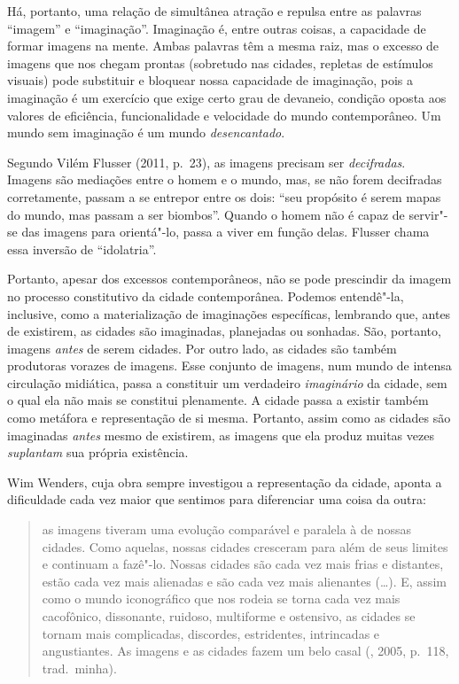 Há, portanto, uma relação de simultânea atração e repulsa entre as
palavras ``imagem'' e ``imaginação''. Imaginação é, entre outras coisas,
a capacidade de formar imagens na mente. Ambas palavras têm a mesma
raiz, mas o excesso de imagens que nos chegam prontas (sobretudo nas
cidades, repletas de estímulos visuais) pode substituir e bloquear nossa
capacidade de imaginação, pois a imaginação é um exercício que exige
certo grau de devaneio, condição oposta aos valores de eficiência,
funcionalidade e velocidade do mundo contemporâneo. Um mundo sem imaginação é um mundo \emph{desencantado}.

Segundo Vilém Flusser (2011, p.~23), as imagens precisam ser
\emph{decifradas}. Imagens são mediações entre o homem e o mundo, mas,
se não forem decifradas corretamente, passam a se entrepor entre os
dois: ``seu propósito é serem mapas do mundo, mas passam a ser
biombos''. Quando o homem não é capaz de servir"-se das imagens para
orientá"-lo, passa a viver em função delas. Flusser chama essa inversão
de ``idolatria''.

Portanto, apesar dos excessos contemporâneos, não se pode prescindir da
imagem no processo constitutivo da cidade contemporânea. Podemos
entendê"-la, inclusive, como a materialização de imaginações específicas,
lembrando que, antes de existirem, as cidades são imaginadas, planejadas
ou sonhadas. São, portanto, imagens \emph{antes} de serem cidades. Por
outro lado, as cidades são também produtoras vorazes de imagens. Esse
conjunto de imagens, num mundo de intensa circulação midiática, passa a
constituir um verdadeiro \emph{imaginário} da cidade, sem o qual ela não
mais se constitui plenamente. A cidade passa a existir também como
metáfora e representação de si mesma. Portanto, assim como as cidades
são imaginadas \emph{antes} mesmo de existirem, as imagens que ela
produz muitas vezes \emph{suplantam} sua própria existência.

Wim Wenders, cuja obra sempre investigou a representação da cidade,
aponta a dificuldade cada vez maior que sentimos para diferenciar uma
coisa da outra:

\begin{quote}
as imagens tiveram uma evolução comparável e paralela à de nossas
cidades. Como aquelas, nossas cidades cresceram para além de seus
limites e continuam a fazê"-lo. Nossas cidades são cada vez mais frias e
distantes, estão cada vez mais alienadas e são cada vez mais alienantes
(\ldots{}). E, assim como o mundo iconográfico que nos rodeia se torna cada
vez mais cacofônico, dissonante, ruidoso, multiforme e ostensivo, as
cidades se tornam mais complicadas, discordes, estridentes, intrincadas
e angustiantes. As imagens e as cidades fazem um belo casal (,
2005, p.~118, trad.~minha).
\end{quote}

